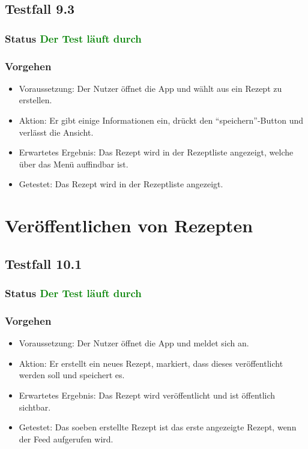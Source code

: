 \subsection{Testfall 9.3}
\subsubsection{Status \textcolor{green}{ Der Test läuft durch} }
\subsubsection{Vorgehen}
\begin{itemize}
\item Voraussetzung: Der Nutzer öffnet die App und wählt aus ein Rezept zu erstellen. 
\item Aktion: Er gibt einige Informationen ein, drückt den "`speichern"'-Button und verlässt die Ansicht.
\item Erwartetes Ergebnis: Das Rezept wird in der Rezeptliste angezeigt, welche über das Menü auffindbar ist. 
\item Getestet: Das Rezept wird in der Rezeptliste angezeigt.
\end{itemize}


\section{Veröffentlichen von Rezepten}

\subsection{Testfall 10.1}
\subsubsection{Status \textcolor{green}{ Der Test läuft durch} }
\subsubsection{Vorgehen}
\begin{itemize}
\item Voraussetzung: Der Nutzer öffnet die App und meldet sich an. 
\item Aktion: Er erstellt ein neues Rezept, markiert, dass dieses veröffentlicht werden soll und speichert es.
\item Erwartetes Ergebnis: Das Rezept wird veröffentlicht und ist öffentlich sichtbar.
\item Getestet: Das soeben erstellte Rezept ist das erste angezeigte Rezept, wenn der Feed aufgerufen wird.
\end{itemize}

